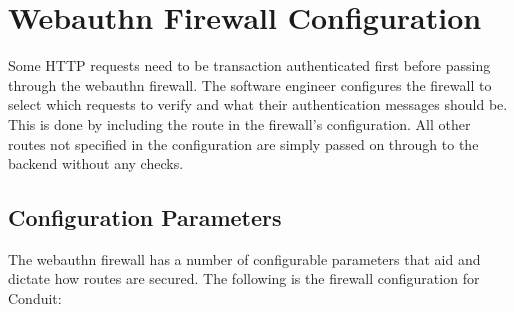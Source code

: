 

\section{Webauthn Firewall Configuration}


Some HTTP requests need to be transaction authenticated first before passing through the webauthn firewall. The software engineer configures the firewall to select which requests to verify and what their authentication messages should be. This is done by including the route in the firewall's configuration. All other routes not specified in the configuration are simply passed on through to the backend without any checks.





\subsection{Configuration Parameters}\label{Sec:ConfigurationParameters}

The webauthn firewall has a number of configurable parameters that aid and dictate how routes are secured. The following is the firewall configuration for Conduit:

